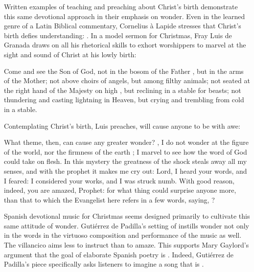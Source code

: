 Written examples of teaching and preaching about Christ's birth demonstrate this
same devotional approach in their emphasis on wonder.
Even in the learned genre of a Latin Biblical commentary, Cornelius à Lapide
stresses that Christ's birth defies understanding: 
.%
    \Autocite
    [50, on ]
    {Lapide:Gospels19C}
In a model sermon for Christmas, Fray Luis de Granada draws on all his
rhetorical skills to exhort worshippers to marvel at the sight and sound of
Christ at his lowly birth:
\begin{quoting}
    Come and see the Son of God, not in the bosom of the Father , but
    in the arms of the Mother; not above choirs of angels, but among filthy
    animals; not seated at the right hand of the Majesty on high ,
    but reclining in a stable for beasts; not thundering and casting lightning
    in Heaven, but crying and trembling from cold in a stable.%
        \Autocite[37]{LuisdeGranada:Xmas}
\end{quoting}
Contemplating Christ's birth, Luis preaches, will cause anyone to be
 with awe:
\begin{quoting}
    What theme, then, can cause any greater wonder? \Dots{} 
    , I do not wonder at the figure of the world, nor
    the firmness of the earth \Dots{}; I marvel to see how the word of God could
    take on flesh. \Dots{} 
    In this mystery the greatness of the shock steals away all my senses, and
    with the prophet  it makes me cry out: Lord, I heard your words,
    and I feared: I considered your works, and I was struck numb.
    With good reason, indeed, you are amazed, Prophet: for what thing could
    surprise anyone more, than that to which the Evangelist here refers in a few
    words, saying, ?%
        \Autocite[38]{LuisdeGranada:Xmas}
\end{quoting}

Spanish devotional music for Christmas seems designed primarily to cultivate
this same attitude of wonder.
Gutiérrez de Padilla's setting of  instills
wonder not only in the words in the virtuoso composition and performance of the
music as well.
The villancico aims less to instruct than to amaze. 
This supports Mary Gaylord's argument that the goal of elaborate Spanish poetry
is .%
    \Autocite[227]{Gaylord:Poetry}
Indeed, Gutiérrez de Padilla's piece specifically asks listeners to imagine a
song that is .

